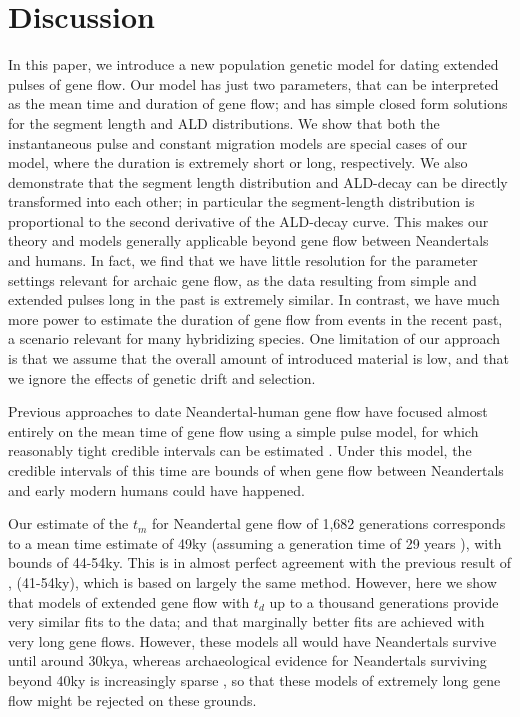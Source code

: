 \documentclass[11pt]{article}
\begin{document}
\section{Discussion}\label{discussion}
In this paper, we introduce a new population genetic model for dating extended pulses of gene flow. Our model has just two parameters, that can be interpreted as the mean time and duration of gene flow; and has simple closed form solutions for the segment length and ALD distributions. We show that both the instantaneous pulse and constant migration models are special cases of our model, where the duration is extremely short or long, respectively. We also demonstrate that the segment length distribution and ALD-decay can be directly transformed into each other; in particular the segment-length distribution is proportional to the second derivative of the ALD-decay curve. This makes our theory and models generally applicable beyond gene flow between Neandertals and humans. In fact, we find that we have little resolution for the parameter settings relevant for archaic gene flow, as the data resulting from simple and extended pulses long in the past is extremely similar. In contrast, we have much more power to estimate the duration of gene flow from events in the recent past, a scenario relevant for many hybridizing species. One limitation of our approach is that we assume that the overall amount of introduced material is low, and that we ignore the effects of genetic drift and selection.

Previous approaches to date Neandertal-human gene flow have focused almost entirely on the mean time of gene flow using a simple pulse model, for which reasonably tight credible intervals can be estimated \citep{sankararaman_date_2012, moorjani_genetic_2016}. Under this model, the credible intervals of this time are bounds of when gene flow between Neandertals and early modern humans could have happened. 

Our estimate of the $t_m$ for Neandertal gene flow of 1,682 generations corresponds to a mean time estimate of 49ky (assuming a generation time of 29 years \cite{moorjani_genetic_2016}), with bounds of 44-54ky. This is in almost perfect agreement with the previous result of \citep{moorjani_genetic_2016}, (41-54ky), which is based on largely the same method. However, here we show that models of extended gene flow with $t_d$ up to a thousand generations provide very similar fits to the data; and that marginally better fits are achieved with very long gene flows. However, these models all would have Neandertals survive until around 30kya, whereas archaeological evidence for Neandertals surviving beyond 40ky is increasingly sparse \citep{hublin_last_2017}, so that these models of extremely long gene flow might be rejected on these grounds. 
\end{document}
